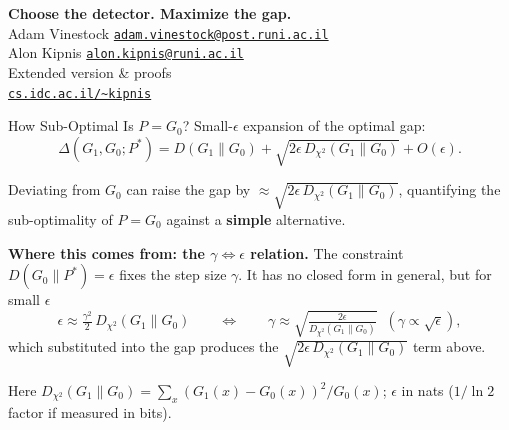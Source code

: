 \documentclass[aspectratio=169, 10pt]{beamer}
\newcommand{\Dkl}[2]{D(#1 \| #2)}
\newcommand{\Dchi}[2]{D_{\chi^2}(#1 \| #2)}
\newcommand{\bigDelta}{\Delta}
\begin{document}
{
\hypersetup{urlcolor=white}
\begin{frame}[plain, c]
  \centering
  {\LARGE\textbf{Choose the detector. Maximize the gap.}}\\[1.8em]
  {\normalsize
    Adam Vinestock \quad\textbullet\quad
    \href{mailto:adam.vinestock@post.runi.ac.il}%
         {\texttt{adam.vinestock@post.runi.ac.il}}\\[3pt]
    Alon Kipnis \quad\textbullet\quad
    \href{mailto:alon.kipnis@runi.ac.il}%
         {\texttt{alon.kipnis@runi.ac.il}}
  }\\[1.4em]
  {\small Extended version \& proofs}\\[2pt]
  {\footnotesize\href{https://cs.idc.ac.il/~kipnis}%
                     {\texttt{cs.idc.ac.il/\~{}kipnis}}}
\end{frame}
}

\appendix
{}

\begin{frame}{How Sub-Optimal Is \(P=G_0\)?}
  Small-\(\epsilon\) expansion of the optimal gap:
  \[
    \bigDelta(G_1,G_0;P^*)
    =
    \Dkl{G_1}{G_0}
    +\sqrt{2\epsilon\,\Dchi{G_1}{G_0}}
    +O(\epsilon).
  \]

  \medskip
  \begin{callout}
    Deviating from \(G_0\) can raise the gap by
    \(\approx\sqrt{2\epsilon\,\Dchi{G_1}{G_0}}\),
    quantifying the sub-optimality of \(P=G_0\) against a
    \textbf{simple} alternative.
  \end{callout}

  \medskip
  \textbf{Where this comes from: the \(\gamma \Leftrightarrow \epsilon\) relation.}
  The constraint \(D(G_0\|P^*)=\epsilon\) fixes the step size \(\gamma\).
  It has no closed form in general, but for small \(\epsilon\)
  \[
    \epsilon \approx \tfrac{\gamma^2}{2}\,\Dchi{G_1}{G_0}
    \qquad\Longleftrightarrow\qquad
    \gamma \approx \sqrt{\tfrac{2\epsilon}{\Dchi{G_1}{G_0}}}
    \;\;(\gamma\propto\sqrt{\epsilon}),
  \]
  which substituted into the gap produces the
  \(\sqrt{2\epsilon\,\Dchi{G_1}{G_0}}\) term above.

  \medskip
  {\footnotesize Here
  \(\Dchi{G_1}{G_0}=\sum_x (G_1(x)-G_0(x))^2/G_0(x)\);
  \(\epsilon\) in nats (\(1/\ln2\) factor if measured in bits).}
\end{frame}
\end{document}

